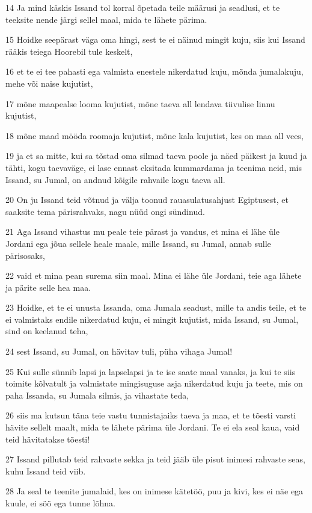 \par 14 Ja mind käskis Issand tol korral õpetada teile määrusi ja seadlusi, et te teeksite nende järgi sellel maal, mida te lähete pärima.
\par 15 Hoidke seepärast väga oma hingi, sest te ei näinud mingit kuju, siis kui Issand rääkis teiega Hoorebil tule keskelt,
\par 16 et te ei tee pahasti ega valmista enestele nikerdatud kuju, mõnda jumalakuju, mehe või naise kujutist,
\par 17 mõne maapealse looma kujutist, mõne taeva all lendava tiivulise linnu kujutist,
\par 18 mõne maad mööda roomaja kujutist, mõne kala kujutist, kes on maa all vees,
\par 19 ja et sa mitte, kui sa tõstad oma silmad taeva poole ja näed päikest ja kuud ja tähti, kogu taevaväge, ei lase ennast eksitada kummardama ja teenima neid, mis Issand, su Jumal, on andnud kõigile rahvaile kogu taeva all.
\par 20 On ju Issand teid võtnud ja välja toonud rauasulatusahjust Egiptusest, et saaksite tema pärisrahvaks, nagu nüüd ongi sündinud.
\par 21 Aga Issand vihastus mu peale teie pärast ja vandus, et mina ei lähe üle Jordani ega jõua sellele heale maale, mille Issand, su Jumal, annab sulle pärisosaks,
\par 22 vaid et mina pean surema siin maal. Mina ei lähe üle Jordani, teie aga lähete ja pärite selle hea maa.
\par 23 Hoidke, et te ei unusta Issanda, oma Jumala seadust, mille ta andis teile, et te ei valmistaks endile nikerdatud kuju, ei mingit kujutist, mida Issand, su Jumal, sind on keelanud teha,
\par 24 sest Issand, su Jumal, on hävitav tuli, püha vihaga Jumal!
\par 25 Kui sulle sünnib lapsi ja lapselapsi ja te ise saate maal vanaks, ja kui te siis toimite kõlvatult ja valmistate mingisuguse asja nikerdatud kuju ja teete, mis on paha Issanda, su Jumala silmis, ja vihastate teda,
\par 26 siis ma kutsun täna teie vastu tunnistajaiks taeva ja maa, et te tõesti varsti hävite sellelt maalt, mida te lähete pärima üle Jordani. Te ei ela seal kaua, vaid teid hävitatakse tõesti!
\par 27 Issand pillutab teid rahvaste sekka ja teid jääb üle pisut inimesi rahvaste seas, kuhu Issand teid viib.
\par 28 Ja seal te teenite jumalaid, kes on inimese kätetöö, puu ja kivi, kes ei näe ega kuule, ei söö ega tunne lõhna.
